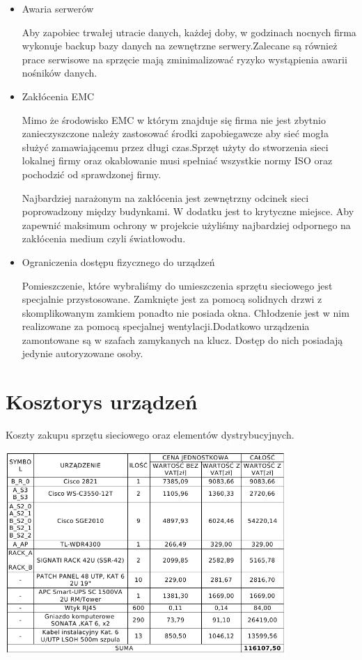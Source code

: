 \documentclass{report}
\begin{document}
\begin{itemize}
\item {Awaria serwerów}

Aby zapobiec trwałej utracie danych, każdej doby, w godzinach nocnych firma wykonuje backup bazy danych na
zewnętrzne serwery.Zalecane są również prace serwisowe na  sprzęcie
mają zminimalizować ryzyko wystąpienia awarii nośników danych.

\item {Zakłócenia EMC}

Mimo że środowisko EMC w którym znajduje się firma nie jest zbytnio zanieczyszczone należy zastosować środki zapobiegawcze
aby sieć mogła służyć zamawiającemu przez długi czas.Sprzęt użyty do
stworzenia sieci lokalnej firmy oraz okablowanie musi spełniać wszystkie normy ISO
oraz pochodzić od sprawdzonej firmy.

Najbardziej narażonym na zakłócenia jest zewnętrzny odcinek sieci poprowadzony między budynkami. W dodatku jest to krytyczne miejsce. 
Aby zapewnić maksimum ochrony w projekcie użyliśmy najbardziej odpornego na zakłócenia medium czyli światłowodu.


\item {Ograniczenia dostępu fizycznego do urządzeń}

Pomieszczenie, które wybraliśmy do umieszczenia sprzętu sieciowego jest specjalnie przystosowane.
Zamknięte jest za pomocą solidnych drzwi z skomplikowanym zamkiem ponadto nie posiada okna. Chłodzenie jest w nim
realizowane za pomocą specjalnej wentylacji.Dodatkowo urządzenia zamontowane są w szafach zamykanych na klucz. 
Dostęp do nich posiadają jedynie autoryzowane osoby.

\end{itemize}

\section{Kosztorys urządzeń}

\begin{table}[H]
\caption{Koszty zakupu sprzętu sieciowego oraz elementów dystrybucyjnych.}
\label{table:koszty_sprzet}
 \centering
      \includegraphics[width=0.8\textwidth]{./obrazki/koszty/koszty_sprzet.png}
\end{table}
\end{document}
